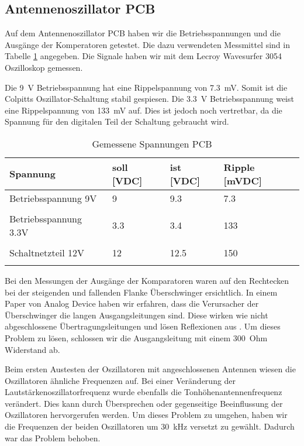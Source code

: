 \subsection{Antennenoszillator PCB}\label{subsec:PCB}
Auf dem Antennenoszillator PCB haben wir die Betriebsspannungen und die Ausgänge der Komperatoren getestet. Die dazu verwendeten Messmittel sind in Tabelle \ref{tab:Gemessene_Spannungen_PCB} angegeben. Die Signale haben wir mit dem Lecroy Wavesurfer 3054 Oszilloskop gemessen. 

Die \SI{9}{V} Betriebsspannung hat eine Rippelspannung von \SI{7.3}{mV}. Somit ist die Colpitts Oszillator-Schaltung stabil gespiesen. Die \SI{3.3}{V} Betriebsspannung weist eine Rippelspannung von \SI{133}{mV} auf. Dies ist jedoch noch vertretbar, da die Spannung für den digitalen Teil der Schaltung gebraucht wird.
\begin{table}[H]
	\centering
	\caption{Gemessene Spannungen PCB}
	\label{tab:Gemessene_Spannungen_PCB}
	\begin{tabular}{l|l|l|l}
		\textbf{Spannung} & \textbf{soll [VDC]} & \textbf{ist [VDC]} &	\textbf{Ripple [mVDC]}\\
		\hline \hline
		
		Betriebsspannung 9V & 9 & 9.3 &  7.3 \\ 
		&      &   &   \\ 
		\hline
		Betriebsspannung 3.3V & 3.3 & 3.4 &  133 \\ 
		&     &     &   \\ 
		\hline
		Schaltnetzteil 12V & 12 & 12.5 &  150 \\ 
		&     &       &   \\ 
		\hline
		
	\end{tabular}
\end{table} 

Bei den Messungen der Ausgänge der Komparatoren waren auf den Rechtecken bei der steigenden und fallenden Flanke Überschwinger ersichtlich. In einem Paper von Analog Device haben wir erfahren, dass die Verursacher der Überschwinger die langen Ausgangsleitungen sind. Diese wirken wie nicht abgeschlossene Übertragungsleitungen und lösen Reflexionen aus \cite{comparator_techniques}. Um dieses Problem zu lösen, schlossen wir die Ausgangsleitung mit einem \SI{300}{Ohm} Widerstand ab.

Beim ersten Austesten der Oszillatoren mit angeschlossenen Antennen wiesen die Oszillatoren ähnliche Frequenzen auf. Bei einer Veränderung der Lautstärkenoszillatorfrequenz wurde ebenfalls die Tonhöhenantennenfrequenz verändert. Dies kann durch Übersprechen oder gegenseitige Beeinflussung der Oszillatoren hervorgerufen werden. Um dieses Problem zu umgehen, haben wir die Frequenzen der beiden Oszillatoren um \SI{30}{kHz} versetzt zu gewählt. Dadurch war das Problem behoben. 

